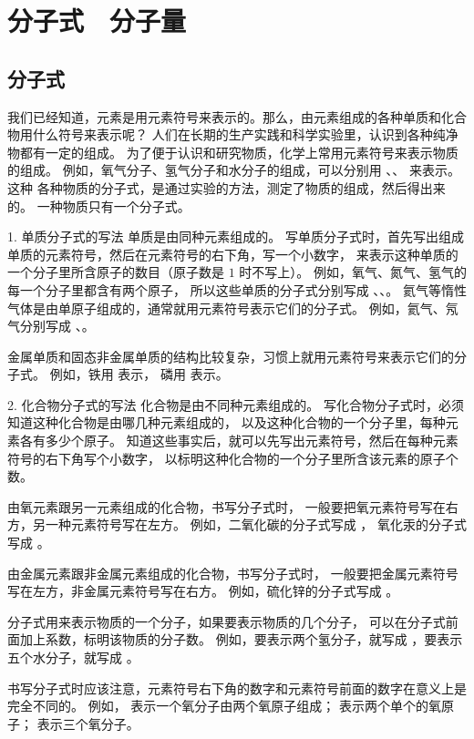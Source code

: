 \section{分子式　分子量}\label{sec:1-7}

\subsection{分子式}

我们已经知道，元素是用元素符号来表示的。那么，由元素组成的各种单质和化合物用什么符号来表示呢？
人们在长期的生产实践和科学实验里，认识到各种纯净物都有一定的组成。
为了便于认识和研究物质，化学上常用元素符号来表示物质的组成。
例如，氧气分子、氢气分子和水分子的组成，可以分别用 、、 来表示。
这种
各种物质的分子式，是通过实验的方法，测定了物质的组成，然后得出来的。
一种物质只有一个分子式。

1. 单质分子式的写法 \quad 单质是由同种元素组成的。
写单质分子式时，首先写出组成单质的元素符号，然后在元素符号的右下角，写一个小数字，
来表示这种单质的一个分子里所含原子的数目（原子数是 $1$ 时不写上）。
例如，氧气、氮气、氢气的每一个分子里都含有两个原子，
所以这些单质的分子式分别写成 、、。
氦气等惰性气体是由单原子组成的，通常就用元素符号表示它们的分子式。
例如，氦气、氖气分别写成 、。

金属单质和固态非金属单质的结构比较复杂，习惯上就用元素符号来表示它们的分子式。
例如，铁用  表示， 磷用  表示。

2. 化合物分子式的写法 \quad 化合物是由不同种元素组成的。
写化合物分子式时，必须知道这种化合物是由哪几种元素组成的，
以及这种化合物的一个分子里，每种元素各有多少个原子。
知道这些事实后，就可以先写出元素符号，然后在每种元素符号的右下角写个小数字，
以标明这种化合物的一个分子里所含该元素的原子个数。

由氧元素跟另一元素组成的化合物，书写分子式时，
一般要把氧元素符号写在右方，另一种元素符号写在左方。
例如，二氧化碳的分子式写成 ， 氧化汞的分子式写成 。

由金属元素跟非金属元素组成的化合物，书写分子式时，
一般要把金属元素符号写在左方，非金属元素符号写在右方。
例如，硫化锌的分子式写成 。

分子式用来表示物质的一个分子，如果要表示物质的几个分子，
可以在分子式前面加上系数，标明该物质的分子数。
例如，要表示两个氢分子，就写成 ，要表示五个水分子，就写成 。

书写分子式时应该注意，元素符号右下角的数字和元素符号前面的数字在意义上是完全不同的。
例如， 表示一个氧分子由两个氧原子组成； 表示两个单个的氧原子； 表示三个氧分子。

